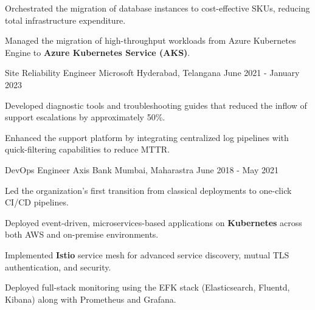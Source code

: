 \begin{cventries}
{\begin{cvitems}
    \item {Orchestrated the migration of database instances to cost-effective SKUs, reducing total infrastructure expenditure.}
    \item {Managed the migration of high-throughput workloads from Azure Kubernetes Engine to \textbf{Azure Kubernetes Service (AKS)}.}
  \end{cvitems}
  }
  \cventry
  {Site Reliability Engineer} %
  {Microsoft} %
  {Hyderabad, Telangana} %
  {June 2021 - January 2023} %
  {
  \begin{cvitems} %
  \item {Developed diagnostic tools and troubleshooting guides that reduced the inflow of support escalations by approximately 50\%.}
  \item {Enhanced the support platform by integrating centralized log pipelines with quick-filtering capabilities to reduce MTTR.}
  \end{cvitems}
  }
  \cventry
    {DevOps Engineer} %
    {Axis Bank} %
    {Mumbai, Maharastra} %
    {June 2018 - May 2021} %
    {
      \begin{cvitems} %
        \item {Led the organization's first transition from classical deployments to one-click CI/CD pipelines.}
        \item {Deployed event-driven, microservices-based applications on \textbf{Kubernetes} across both AWS and on-premise environments.}
        \item {Implemented \textbf{Istio} service mesh for advanced service discovery, mutual TLS authentication, and security.}
        \item {Deployed full-stack monitoring using the EFK stack (Elasticsearch, Fluentd, Kibana) along with Prometheus and Grafana.}
      \end{cvitems}
    }
\end{cventries}
